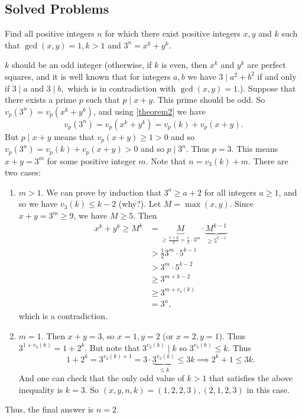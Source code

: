 \documentclass[main.tex]{subfile}
\begin{document}
\subsection{Solved Problems}


    \begin{problem}[Russia 1996]
        Find all positive integers $n$ for which there exist positive integers $x ,y$ and $k$ such that $\gcd(x,y)=1, k>1$ and $3^n = x^k + y^k.$
    \end{problem}

    \begin{solution}
        $k$ should be an odd integer (otherwise, if $k$ is even, then $x^k$ and $y^k$ are perfect squares, and it is well known that for integers $a,b$ we have $3 \mid a^2+b^2$ if and only if $3 \mid a$ and $3 \mid b,$ which is in contradiction with $\gcd(x,y)=1.$). Suppose that there exists a prime $p$ such that $p \mid x+y$. This prime should be odd. So $v_p(3^n)=v_p(x^k+y^k)$, and using \eqref{theorem2} we have $$v_p(3^n)=v_p(x^k+y^k)=v_p(k)+v_p(x+y).$$ But $p \mid x+y$ means that $v_p(x+y) \geq 1 >0$ and so $v_p(3^n)=v_p(k)+v_p(x+y) >0$ and so $p \mid 3^n$. Thus $p=3.$ This means $x+y=3^m$ for some positive integer $m$. Note that $n=v_3(k)+m$. There are two cases:
            \begin{enumerate}
                \item $m>1$. We can prove by induction that $3^a \ge a+2$ for all integers $a\ge 1$, and so we have $v_3(k) \leq k-2$ (why?). Let $M= \max(x,y)$. Since $x+y=3^m\ge 9$, we have $M \geq 5$. Then
                \begin{align*}
	                x^k+ y^k \geq M^k  & =  \underbrace{M}_{\geq \frac{x+y}{2} = \frac{1}{2} \cdot 3^m} \cdot \underbrace{M^{k-1}}_{\geq 5^{k-1}} \\
	                & > \frac{1}{2} 3^m \cdot 5^{k-1} \\
	                &  >3^m \cdot 5^{k-2}\\
	                & \geq 3^{m+k-2} \\
	                & \geq 3^{m + v_3(k)}\\
	                & = 3^n,
                \end{align*}
                which is a contradiction.
                
                \item $m=1$. Then $x+y=3$, so $x=1, y=2$ (or $x=2, y=1$). Thus $3^{1+v_3(k)}= 1+2^k$. But note that
                $3^{v_3(k)} \mid k$ so $3^{v_3(k)} \leq k$. Thus
                \[1+2^k = 3^{v_3(k)+1} = 3 \cdot \underbrace{3^{v_3(k)}}_{\leq k} \leq 3k \implies 2^k +1 \leq 3k .\]
                And one can check that the only odd value of $k>1$ that satisfies the above inequality is $k=3$. So $(x,y,n,k)=(1,2,2,3), (2,1,2,3)$ in this case.
            \end{enumerate}
    Thus, the final answer is $n=2.$
    
    \end{solution}
\end{document}
